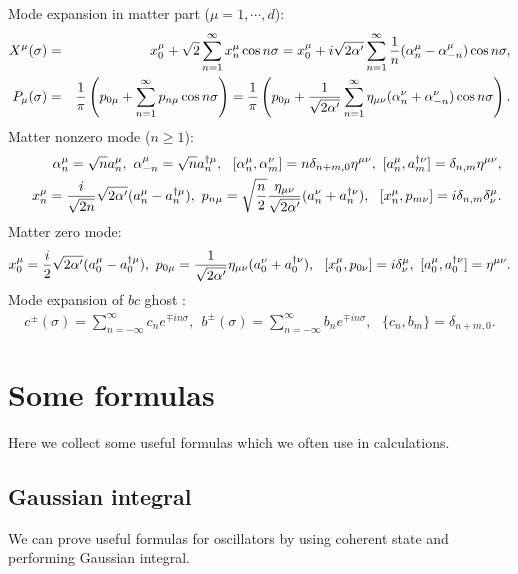 \documentclass[12pt,a4paper]{article}
\begin{document}
Mode expansion in matter part ($\mu=1,\cdots,d$):
\begin{eqnarray}
X^\mu(\sigma)&=&x_0^\mu+\sqrt2 \sum_{n=1}^\infty x_n^\mu\cos n\sigma=x_0^\mu+i\sqrt{2\alpha'}\sum_{n=1}^\infty{1\over n}(\alpha_n^\mu-\alpha_{-n}^\mu)\cos n\sigma,\nonumber \\
P_\mu(\sigma)&=&{1\over\pi}\left(p_{0\mu}+\sum_{n=1}^\infty p_{n\mu}\cos n\sigma\right)={1\over\pi}\left(p_{0\mu}+{1\over\sqrt{2\alpha'}}\sum_{n=1}^\infty\eta_{\mu\nu}(\alpha_n^\nu+\alpha_{-n}^\nu)\cos n\sigma\right).\nonumber \\
\end{eqnarray}
Matter nonzero mode ($n\geq1$):
\begin{eqnarray}
&&\alpha_n^\mu=\sqrt n a_n^\mu,\ \alpha_{-n}^\mu=\sqrt{n}a_n^{\dagger\mu},\ \ [\alpha_n^\mu,\alpha_m^\nu]=n\delta_{n+m,0}\eta^{\mu\nu},\ [a_n^\mu,a_m^{\dagger\nu}]=\delta_{n,m}\eta^{\mu\nu},\nonumber \\
&&x_n^\mu={i\over\sqrt{2n}}\sqrt{2\alpha'}(a_n^\mu-a_n^{\dagger\mu}),\ p_{n\mu}=\sqrt{n\over2}{\eta_{\mu\nu}\over\sqrt{2\alpha'}}(a_n^\nu+a_n^{\dagger\nu}),\ \ [x_n^\mu,p_{m\nu}]=i\delta_{n,m}\delta^\mu_\nu.
\end{eqnarray}
Matter zero mode:
\begin{equation}
x_0^\mu={i\over2}\sqrt{2\alpha'}(a_0^\mu-a_0^{\dagger\mu}),\ p_{0\mu}={1\over\sqrt{2\alpha'}}\eta_{\mu\nu}(a_0^\nu+a_0^{\dagger\nu}),\ \ [x_0^\mu,p_{0\nu}]=i\delta^\mu_\nu,\ [a_0^\mu,a_0^{\dagger\nu}]=\eta^{\mu\nu}.
\end{equation}
Mode expansion of $bc$ ghost :
\begin{eqnarray}
c^{\pm}(\sigma)=\sum_{n=-\infty}^\infty c_n e^{\mp in\sigma},\ \ b^{\pm}(\sigma)=\sum_{n=-\infty}^\infty b_n e^{\mp in\sigma},\ \ \ \{c_n,b_m\}=\delta_{n+m,0}.
\end{eqnarray}


\section{Some formulas}

Here we collect some useful formulas which we often use in calculations.

\subsection{Gaussian integral}

We can prove useful formulas for oscillators by using coherent state and performing Gaussian integral.
\end{document}
